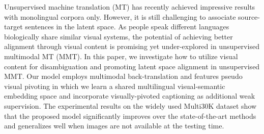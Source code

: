 Unsupervised machine translation (MT) has recently achieved impressive results with monolingual corpora only. However, it is still challenging to associate source-target sentences in the latent space. As people speak different languages biologically share similar visual systems, the potential of achieving better alignment through visual content is promising yet under-explored in unsupervised multimodal MT (MMT). In this paper, we investigate how to utilize visual content for disambiguation and promoting latent space alignment in unsupervised MMT. Our model employs multimodal back-translation and features pseudo visual pivoting in which we learn a shared multilingual visual-semantic embedding space and incorporate visually-pivoted captioning as additional weak supervision. The experimental results on the widely used Multi30K dataset show that the proposed model significantly improves over the state-of-the-art methods and generalizes well when images are not available at the testing time.
